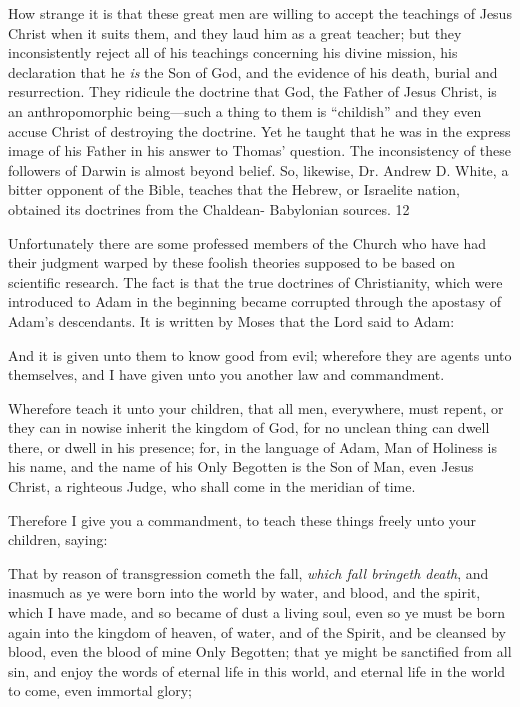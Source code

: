 How strange it is that these great men are willing to accept the teachings of Jesus Christ
when it suits them, and they laud him as a great teacher; but they inconsistently reject all of
his teachings concerning his divine mission, his declaration that he \textit{is} the Son of God, and the
evidence of his death, burial and resurrection. They ridicule the doctrine that God, the Father
of Jesus Christ, is an anthropomorphic being—such a thing to them is ``childish'' and they
even accuse Christ of destroying the doctrine. Yet he taught that he was in the express image
of his Father in his answer to Thomas' question. The inconsistency of these followers of
Darwin is almost beyond belief. So, likewise, Dr. Andrew D. White, a bitter opponent of the
Bible, teaches that the Hebrew, or Israelite nation, obtained its doctrines from the Chaldean-
Babylonian sources. 12

Unfortunately there are some professed members of the Church who have had their judgment
warped by these foolish theories supposed to be based on scientific research. The fact is that
the true doctrines of Christianity, which were introduced to Adam in the beginning became
corrupted through the apostasy of Adam's descendants. It is written by Moses that the Lord
said to Adam:

And it is given unto them to know good from evil; wherefore they are agents unto
themselves, and I have given unto you another law and commandment.

Wherefore teach it unto your children, that all men, everywhere, must repent, or they can in
nowise inherit the kingdom of God, for no unclean thing can dwell there, or dwell in his
presence; for, in the language of Adam, Man of Holiness is his name, and the name of his
Only Begotten is the Son of Man, even Jesus Christ, a righteous Judge, who shall come in the
meridian of time.

Therefore I give you a commandment, to teach these things freely unto your children, saying:

That by reason of transgression cometh the fall, \textit{which fall bringeth death}, and inasmuch as
ye were born into the world by water, and blood, and the spirit, which I have made, and so
became of dust a living soul, even so ye must be born again into the kingdom of heaven, of
water, and of the Spirit, and be cleansed by blood, even the blood of mine Only Begotten;
that ye might be sanctified from all sin, and enjoy the words of eternal life in this world, and
eternal life in the world to come, even immortal glory;

